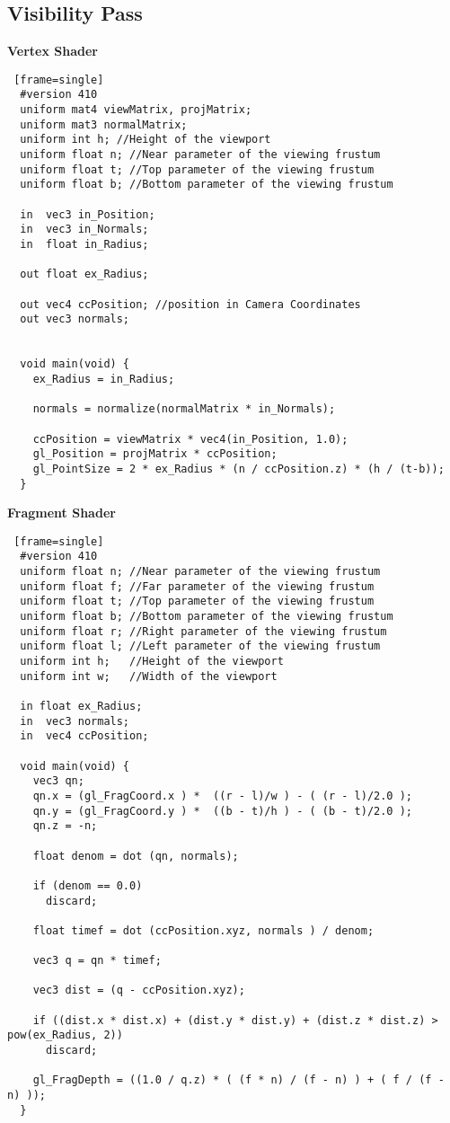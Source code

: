 \subsection{Visibility Pass}
\textbf{Vertex Shader}
\begin{lstlisting} [frame=single]
  #version 410
  uniform mat4 viewMatrix, projMatrix;
  uniform mat3 normalMatrix;
  uniform int h; //Height of the viewport
  uniform float n; //Near parameter of the viewing frustum
  uniform float t; //Top parameter of the viewing frustum
  uniform float b; //Bottom parameter of the viewing frustum

  in  vec3 in_Position;
  in  vec3 in_Normals;
  in  float in_Radius;

  out float ex_Radius;

  out vec4 ccPosition; //position in Camera Coordinates
  out vec3 normals;


  void main(void) {
    ex_Radius = in_Radius;

    normals = normalize(normalMatrix * in_Normals);

    ccPosition = viewMatrix * vec4(in_Position, 1.0);
    gl_Position = projMatrix * ccPosition;
    gl_PointSize = 2 * ex_Radius * (n / ccPosition.z) * (h / (t-b));
  }
\end{lstlisting}
\newpage

\textbf{Fragment Shader}
\begin{lstlisting} [frame=single]
  #version 410
  uniform float n; //Near parameter of the viewing frustum
  uniform float f; //Far parameter of the viewing frustum
  uniform float t; //Top parameter of the viewing frustum
  uniform float b; //Bottom parameter of the viewing frustum
  uniform float r; //Right parameter of the viewing frustum
  uniform float l; //Left parameter of the viewing frustum
  uniform int h;   //Height of the viewport
  uniform int w;   //Width of the viewport

  in float ex_Radius;
  in  vec3 normals;
  in  vec4 ccPosition;

  void main(void) {
    vec3 qn;
    qn.x = (gl_FragCoord.x ) *  ((r - l)/w ) - ( (r - l)/2.0 );
    qn.y = (gl_FragCoord.y ) *  ((b - t)/h ) - ( (b - t)/2.0 );
    qn.z = -n;

    float denom = dot (qn, normals);

    if (denom == 0.0)
      discard;

    float timef = dot (ccPosition.xyz, normals ) / denom;

    vec3 q = qn * timef;

    vec3 dist = (q - ccPosition.xyz);

    if ((dist.x * dist.x) + (dist.y * dist.y) + (dist.z * dist.z) > pow(ex_Radius, 2))
      discard;

    gl_FragDepth = ((1.0 / q.z) * ( (f * n) / (f - n) ) + ( f / (f - n) ));
  }
\end{lstlisting}
\newpage

